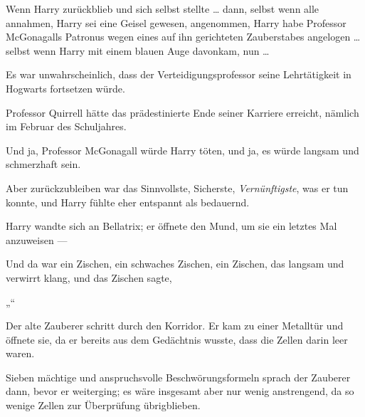 Wenn Harry zurückblieb und sich selbst stellte … dann, selbst wenn alle annahmen, Harry sei eine Geisel gewesen, angenommen, Harry habe Professor McGonagalls Patronus wegen eines auf ihn gerichteten Zauberstabes angelogen … selbst wenn Harry mit einem blauen Auge davonkam, nun …

Es war unwahrscheinlich, dass der Verteidigungsprofessor seine Lehrtätigkeit in Hogwarts fortsetzen würde.

Professor Quirrell hätte das prädestinierte Ende seiner Karriere erreicht, nämlich im Februar des Schuljahres.

Und ja, Professor McGonagall würde Harry töten, und ja, es würde langsam und schmerzhaft sein.

Aber zurückzubleiben war das Sinnvollste, Sicherste, \emph{Vernünftigste}, was er tun konnte, und Harry fühlte eher entspannt als bedauernd.

Harry wandte sich an Bellatrix; er öffnete den Mund, um sie ein letztes Mal anzuweisen —

Und da war ein Zischen, ein schwaches Zischen, ein Zischen, das langsam und verwirrt klang, und das Zischen sagte,

„“

\later

Der alte Zauberer schritt durch den Korridor. Er kam zu einer Metalltür und öffnete sie, da er bereits aus dem Gedächtnis wusste, dass die Zellen darin leer waren.

Sieben mächtige und anspruchsvolle Beschwörungsformeln sprach der Zauberer dann, bevor er weiterging; es wäre insgesamt aber nur wenig anstrengend, da so wenige Zellen zur Überprüfung übrigblieben.


